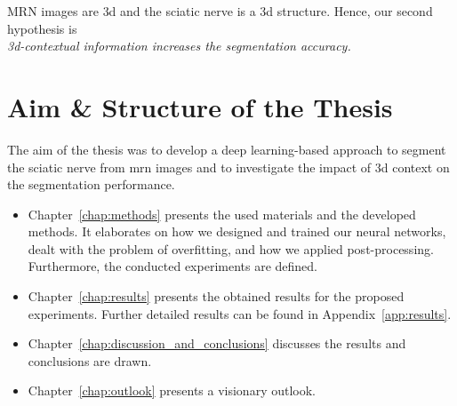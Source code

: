 MRN images are \gls{3d} and the sciatic nerve is a \gls{3d} structure. Hence, our second hypothesis is\\

\textit{\gls{3d}-contextual information increases the segmentation accuracy.}

\section{Aim \& Structure of the Thesis} %
The aim of the thesis was to develop a deep learning-based approach to segment the sciatic nerve from \gls{mrn} images and to investigate the impact of \gls{3d} context on the segmentation performance.\\
\begin{itemize}
    \item Chapter~\ref{chap:methods} presents the used materials and the developed methods. It elaborates on how we designed and trained our neural networks, dealt with the problem of overfitting, and how we applied post-processing. Furthermore, the conducted experiments are defined.
    \item Chapter~\ref{chap:results} presents the obtained results for the proposed experiments. Further detailed results can be found in Appendix~\ref{app:results}.
    \item Chapter~\ref{chap:discussion_and_conclusions} discusses the results and conclusions are drawn.
    \item Chapter~\ref{chap:outlook} presents a visionary outlook.
\end{itemize}

\endinput